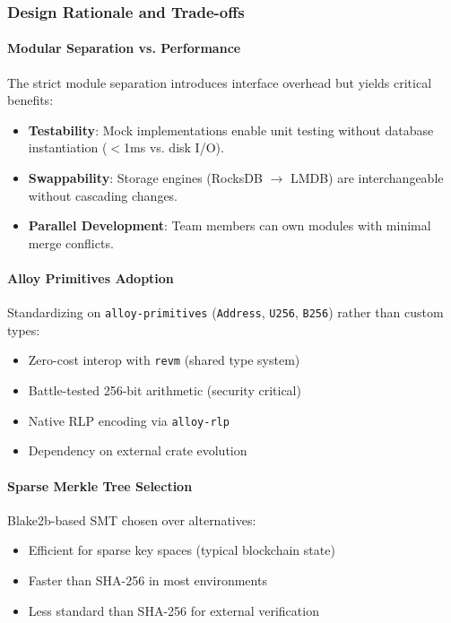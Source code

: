 \subsubsection{Design Rationale and Trade-offs}
\label{sec:rationale}

\paragraph{Modular Separation vs. Performance}
The strict module separation introduces interface overhead but yields critical benefits:
\begin{itemize}[leftmargin=*]
    \item \textbf{Testability}: Mock implementations enable unit testing without database instantiation ($<$1ms vs. disk I/O).
    \item \textbf{Swappability}: Storage engines (RocksDB $\rightarrow$ LMDB) are interchangeable without cascading changes.
    \item \textbf{Parallel Development}: Team members can own modules with minimal merge conflicts.
\end{itemize}

\paragraph{Alloy Primitives Adoption}
Standardizing on \texttt{alloy-primitives} (\texttt{Address}, \texttt{U256}, \texttt{B256}) rather than custom types:
\begin{itemize}[leftmargin=*]
    \item[\cmark] Zero-cost interop with \texttt{revm} (shared type system)
    \item[\cmark] Battle-tested 256-bit arithmetic (security critical)
    \item[\cmark] Native RLP encoding via \texttt{alloy-rlp}
    \item[\xmark] Dependency on external crate evolution
\end{itemize}

\paragraph{Sparse Merkle Tree Selection}
Blake2b-based SMT chosen over alternatives:
\begin{itemize}[leftmargin=*]
    \item[\cmark] Efficient for sparse key spaces (typical blockchain state)
    \item[\cmark] Faster than SHA-256 in most environments
    \item[\xmark] Less standard than SHA-256 for external verification
\end{itemize}

